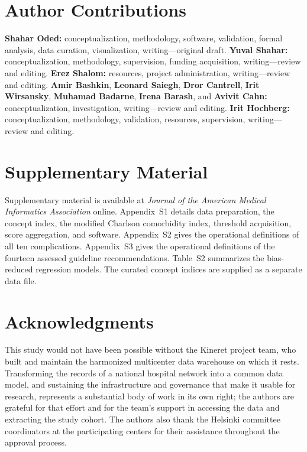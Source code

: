 
\section*{Author Contributions}
\textbf{Shahar Oded:} conceptualization, methodology, software, validation,
formal analysis, data curation, visualization, writing---original draft.
\textbf{Yuval Shahar:} conceptualization, methodology, supervision, funding
acquisition, writing---review and editing.
\textbf{Erez Shalom:} resources, project administration, writing---review and
editing.
\textbf{Amir Bashkin}, \textbf{Leonard Saiegh}, \textbf{Dror Cantrell},
\textbf{Irit Wirsansky}, \textbf{Muhamad Badarne}, \textbf{Irena Barash}, and
\textbf{Avivit Cahn:} conceptualization, investigation, writing---review and
editing.
\textbf{Irit Hochberg:} conceptualization, methodology, validation,
resources, supervision, writing---review and editing.

\section*{Supplementary Material}
Supplementary material is available at \emph{Journal of the American Medical
Informatics Association} online. Appendix~S1 details data preparation, the
concept index, the modified Charlson comorbidity index, threshold
acquisition, score aggregation, and software. Appendix~S2 gives the
operational definitions of all ten complications. Appendix~S3 gives the
operational definitions of the fourteen assessed guideline recommendations.
Table~S2 summarizes the bias-reduced regression models. The curated concept
indices are supplied as a separate data file.

\section*{Acknowledgments}
This study would not have been possible without the Kineret project team, who
built and maintain the harmonized multicenter data warehouse on which it
rests. Transforming the records of a national hospital network into a common
data model, and sustaining the infrastructure and governance that make it
usable for research, represents a substantial body of work in its own right;
the authors are grateful for that effort and for the team's support in
accessing the data and extracting the study cohort. The authors also thank
the Helsinki committee coordinators at the participating centers for their
assistance throughout the approval process.

